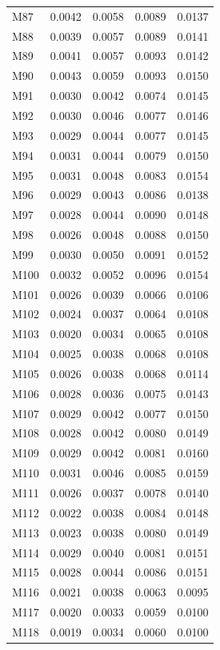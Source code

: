 \begin{longtable}{lrrrr}
M87 & 0.0042 & 0.0058 & 0.0089 & 0.0137 \\
M88 & 0.0039 & 0.0057 & 0.0089 & 0.0141 \\
M89 & 0.0041 & 0.0057 & 0.0093 & 0.0142 \\
M90 & 0.0043 & 0.0059 & 0.0093 & 0.0150 \\
M91 & 0.0030 & 0.0042 & 0.0074 & 0.0145 \\
M92 & 0.0030 & 0.0046 & 0.0077 & 0.0146 \\
M93 & 0.0029 & 0.0044 & 0.0077 & 0.0145 \\
M94 & 0.0031 & 0.0044 & 0.0079 & 0.0150 \\
M95 & 0.0031 & 0.0048 & 0.0083 & 0.0154 \\
M96 & 0.0029 & 0.0043 & 0.0086 & 0.0138 \\
M97 & 0.0028 & 0.0044 & 0.0090 & 0.0148 \\
M98 & 0.0026 & 0.0048 & 0.0088 & 0.0150 \\
M99 & 0.0030 & 0.0050 & 0.0091 & 0.0152 \\
M100 & 0.0032 & 0.0052 & 0.0096 & 0.0154 \\
M101 & 0.0026 & 0.0039 & 0.0066 & 0.0106 \\
M102 & 0.0024 & 0.0037 & 0.0064 & 0.0108 \\
M103 & 0.0020 & 0.0034 & 0.0065 & 0.0108 \\
M104 & 0.0025 & 0.0038 & 0.0068 & 0.0108 \\
M105 & 0.0026 & 0.0038 & 0.0068 & 0.0114 \\
M106 & 0.0028 & 0.0036 & 0.0075 & 0.0143 \\
M107 & 0.0029 & 0.0042 & 0.0077 & 0.0150 \\
M108 & 0.0028 & 0.0042 & 0.0080 & 0.0149 \\
M109 & 0.0029 & 0.0042 & 0.0081 & 0.0160 \\
M110 & 0.0031 & 0.0046 & 0.0085 & 0.0159 \\
M111 & 0.0026 & 0.0037 & 0.0078 & 0.0140 \\
M112 & 0.0022 & 0.0038 & 0.0084 & 0.0148 \\
M113 & 0.0023 & 0.0038 & 0.0080 & 0.0149 \\
M114 & 0.0029 & 0.0040 & 0.0081 & 0.0151 \\
M115 & 0.0028 & 0.0044 & 0.0086 & 0.0151 \\
M116 & 0.0021 & 0.0038 & 0.0063 & 0.0095 \\
M117 & 0.0020 & 0.0033 & 0.0059 & 0.0100 \\
M118 & 0.0019 & 0.0034 & 0.0060 & 0.0100 \\

\end{longtable}
